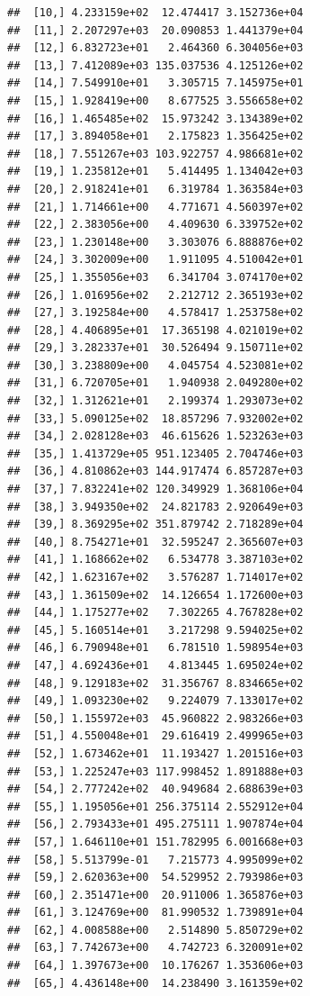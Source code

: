 \documentclass[article]{jss}\usepackage[]{graphicx}\usepackage[]{xcolor}
\makeatletter
\newenvironment{kframe}{%
 \def\at@end@of@kframe{}%
 \ifinner\ifhmode%
  \def\at@end@of@kframe{\end{minipage}}%
  \begin{minipage}{\columnwidth}%
 \fi\fi%
 \def\FrameCommand##1{\hskip\@totalleftmargin \hskip-\fboxsep
 \colorbox{shadecolor}{##1}\hskip-\fboxsep
     \hskip-\linewidth \hskip-\@totalleftmargin \hskip\columnwidth}%
 \MakeFramed {\advance\hsize-\width
   \@totalleftmargin\z@ \linewidth\hsize
   \@setminipage}}%
 {\par\unskip\endMakeFramed%
 \at@end@of@kframe}
\newenvironment{knitrout}{}{} %
\makeatother
\begin{document}
\begin{knitrout}
\begin{kframe}
\begin{verbatim}
##  [10,] 4.233159e+02  12.474417 3.152736e+04
##  [11,] 2.207297e+03  20.090853 1.441379e+04
##  [12,] 6.832723e+01   2.464360 6.304056e+03
##  [13,] 7.412089e+03 135.037536 4.125126e+02
##  [14,] 7.549910e+01   3.305715 7.145975e+01
##  [15,] 1.928419e+00   8.677525 3.556658e+02
##  [16,] 1.465485e+02  15.973242 3.134389e+02
##  [17,] 3.894058e+01   2.175823 1.356425e+02
##  [18,] 7.551267e+03 103.922757 4.986681e+02
##  [19,] 1.235812e+01   5.414495 1.134042e+03
##  [20,] 2.918241e+01   6.319784 1.363584e+03
##  [21,] 1.714661e+00   4.771671 4.560397e+02
##  [22,] 2.383056e+00   4.409630 6.339752e+02
##  [23,] 1.230148e+00   3.303076 6.888876e+02
##  [24,] 3.302009e+00   1.911095 4.510042e+01
##  [25,] 1.355056e+03   6.341704 3.074170e+02
##  [26,] 1.016956e+02   2.212712 2.365193e+02
##  [27,] 3.192584e+00   4.578417 1.253758e+02
##  [28,] 4.406895e+01  17.365198 4.021019e+02
##  [29,] 3.282337e+01  30.526494 9.150711e+02
##  [30,] 3.238809e+00   4.045754 4.523081e+02
##  [31,] 6.720705e+01   1.940938 2.049280e+02
##  [32,] 1.312621e+01   2.199374 1.293073e+02
##  [33,] 5.090125e+02  18.857296 7.932002e+02
##  [34,] 2.028128e+03  46.615626 1.523263e+03
##  [35,] 1.413729e+05 951.123405 2.704746e+03
##  [36,] 4.810862e+03 144.917474 6.857287e+03
##  [37,] 7.832241e+02 120.349929 1.368106e+04
##  [38,] 3.949350e+02  24.821783 2.920649e+03
##  [39,] 8.369295e+02 351.879742 2.718289e+04
##  [40,] 8.754271e+01  32.595247 2.365607e+03
##  [41,] 1.168662e+02   6.534778 3.387103e+02
##  [42,] 1.623167e+02   3.576287 1.714017e+02
##  [43,] 1.361509e+02  14.126654 1.172600e+03
##  [44,] 1.175277e+02   7.302265 4.767828e+02
##  [45,] 5.160514e+01   3.217298 9.594025e+02
##  [46,] 6.790948e+01   6.781510 1.598954e+03
##  [47,] 4.692436e+01   4.813445 1.695024e+02
##  [48,] 9.129183e+02  31.356767 8.834665e+02
##  [49,] 1.093230e+02   9.224079 7.133017e+02
##  [50,] 1.155972e+03  45.960822 2.983266e+03
##  [51,] 4.550048e+01  29.616419 2.499965e+03
##  [52,] 1.673462e+01  11.193427 1.201516e+03
##  [53,] 1.225247e+03 117.998452 1.891888e+03
##  [54,] 2.777242e+02  40.949684 2.688639e+03
##  [55,] 1.195056e+01 256.375114 2.552912e+04
##  [56,] 2.793433e+01 495.275111 1.907874e+04
##  [57,] 1.646110e+01 151.782995 6.001668e+03
##  [58,] 5.513799e-01   7.215773 4.995099e+02
##  [59,] 2.620363e+00  54.529952 2.793986e+03
##  [60,] 2.351471e+00  20.911006 1.365876e+03
##  [61,] 3.124769e+00  81.990532 1.739891e+04
##  [62,] 4.008588e+00   2.514890 5.850729e+02
##  [63,] 7.742673e+00   4.742723 6.320091e+02
##  [64,] 1.397673e+00  10.176267 1.353606e+03
##  [65,] 4.436148e+00  14.238490 3.161359e+02

\end{verbatim}
\end{kframe}
\end{knitrout}
\end{document}
